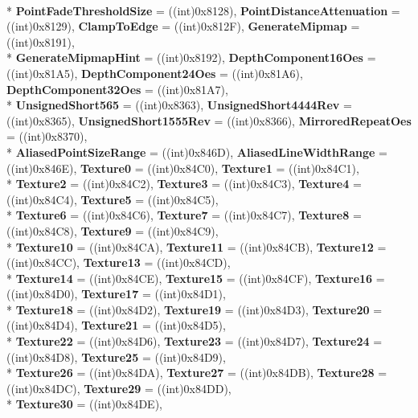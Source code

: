 \begin{DoxyCompactItemize}
\\*
{\bfseries Point\-Fade\-Threshold\-Size} = ((int)0x8128), 
{\bfseries Point\-Distance\-Attenuation} = ((int)0x8129), 
{\bfseries Clamp\-To\-Edge} = ((int)0x812\-F), 
{\bfseries Generate\-Mipmap} = ((int)0x8191), 
\\*
{\bfseries Generate\-Mipmap\-Hint} = ((int)0x8192), 
{\bfseries Depth\-Component16\-Oes} = ((int)0x81\-A5), 
{\bfseries Depth\-Component24\-Oes} = ((int)0x81\-A6), 
{\bfseries Depth\-Component32\-Oes} = ((int)0x81\-A7), 
\\*
{\bfseries Unsigned\-Short565} = ((int)0x8363), 
{\bfseries Unsigned\-Short4444\-Rev} = ((int)0x8365), 
{\bfseries Unsigned\-Short1555\-Rev} = ((int)0x8366), 
{\bfseries Mirrored\-Repeat\-Oes} = ((int)0x8370), 
\\*
{\bfseries Aliased\-Point\-Size\-Range} = ((int)0x846\-D), 
{\bfseries Aliased\-Line\-Width\-Range} = ((int)0x846\-E), 
{\bfseries Texture0} = ((int)0x84\-C0), 
{\bfseries Texture1} = ((int)0x84\-C1), 
\\*
{\bfseries Texture2} = ((int)0x84\-C2), 
{\bfseries Texture3} = ((int)0x84\-C3), 
{\bfseries Texture4} = ((int)0x84\-C4), 
{\bfseries Texture5} = ((int)0x84\-C5), 
\\*
{\bfseries Texture6} = ((int)0x84\-C6), 
{\bfseries Texture7} = ((int)0x84\-C7), 
{\bfseries Texture8} = ((int)0x84\-C8), 
{\bfseries Texture9} = ((int)0x84\-C9), 
\\*
{\bfseries Texture10} = ((int)0x84\-C\-A), 
{\bfseries Texture11} = ((int)0x84\-C\-B), 
{\bfseries Texture12} = ((int)0x84\-C\-C), 
{\bfseries Texture13} = ((int)0x84\-C\-D), 
\\*
{\bfseries Texture14} = ((int)0x84\-C\-E), 
{\bfseries Texture15} = ((int)0x84\-C\-F), 
{\bfseries Texture16} = ((int)0x84\-D0), 
{\bfseries Texture17} = ((int)0x84\-D1), 
\\*
{\bfseries Texture18} = ((int)0x84\-D2), 
{\bfseries Texture19} = ((int)0x84\-D3), 
{\bfseries Texture20} = ((int)0x84\-D4), 
{\bfseries Texture21} = ((int)0x84\-D5), 
\\*
{\bfseries Texture22} = ((int)0x84\-D6), 
{\bfseries Texture23} = ((int)0x84\-D7), 
{\bfseries Texture24} = ((int)0x84\-D8), 
{\bfseries Texture25} = ((int)0x84\-D9), 
\\*
{\bfseries Texture26} = ((int)0x84\-D\-A), 
{\bfseries Texture27} = ((int)0x84\-D\-B), 
{\bfseries Texture28} = ((int)0x84\-D\-C), 
{\bfseries Texture29} = ((int)0x84\-D\-D), 
\\*
{\bfseries Texture30} = ((int)0x84\-D\-E), 

\end{DoxyCompactItemize}
